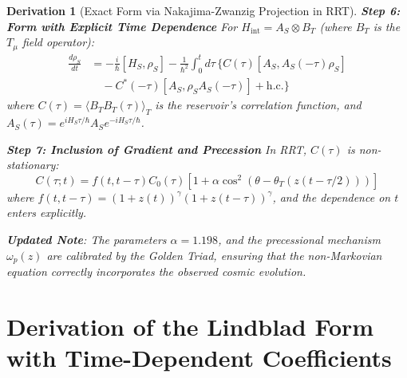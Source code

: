 \documentclass[10pt, a4paper]{article}
\newtheorem{derivation}{Derivation}
\begin{document}
\begin{derivation}[Exact Form via Nakajima-Zwanzig Projection in RRT]
\textbf{Step 6: Form with Explicit Time Dependence}
For $H_{\text{int}} = A_S \otimes B_T$ (where $B_T$ is the $T_\mu$ field operator):
\begin{align}
\frac{d\rho_S}{dt} &= -\frac{i}{\hbar}[H_S, \rho_S] - \frac{1}{\hbar^2} \int_0^t d\tau \, \big\{ C(\tau) [A_S, A_S(-\tau)\rho_S] \\
&\quad - C^*(-\tau) [A_S, \rho_S A_S(-\tau)] + \text{h.c.} \big\}
\tag{25.6}
\end{align}
where $C(\tau) = \langle B_T B_T(\tau) \rangle_T$ is the reservoir's correlation function, and $A_S(\tau) = e^{iH_S\tau/\hbar} A_S e^{-iH_S\tau/\hbar}$.

\textbf{Step 7: Inclusion of Gradient and Precession}
In RRT, $C(\tau)$ is non-stationary:
\begin{equation}
C(\tau; t) = f(t, t-\tau) C_0(\tau) \left[ 1 + \alpha \cos^2(\theta - \theta_T(z(t-\tau/2))) \right]
\tag{25.7}
\end{equation}
where $f(t, t-\tau) = (1+z(t))^\gamma (1+z(t-\tau))^\gamma$, and the dependence on $t$ enters explicitly.

\textbf{Updated Note}: The parameters $\alpha = 1.198$, and the precessional mechanism $\omega_p(z)$ are calibrated by the Golden Triad, ensuring that the non-Markovian equation correctly incorporates the observed cosmic evolution.
\end{derivation}

\section{Derivation of the Lindblad Form with Time-Dependent Coefficients}
\end{document}
